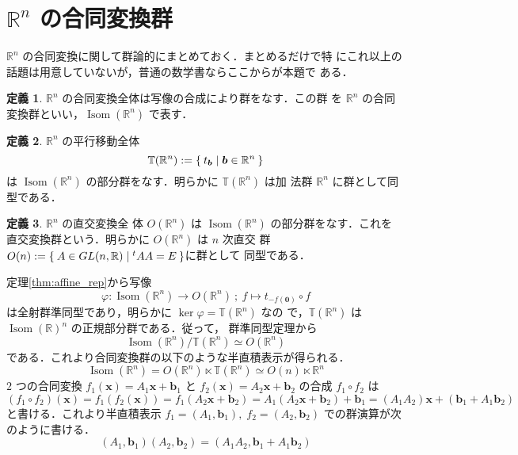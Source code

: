 \documentclass[11pt, uplatex, dvipdfmx, titlepage]{jsarticle}
\DeclareMathOperator{\Isom}{Isom}
\theoremstyle{definition}
\newtheorem*{definition}{定義}
\begin{document}
\section{$\mathbb{R}^n$ の合同変換群}\label{sec:orthogonal}

$\mathbb{R}^n$ の合同変換に関して群論的にまとめておく．まとめるだけで特
にこれ以上の話題は用意していないが，普通の数学書ならここからが本題で
ある．

\begin{definition}
  $\mathbb{R}^n$ の合同変換全体は写像の合成により群をなす．この群
  を $\mathbb{R}^n$ の合同変換群といい，$\Isom(\mathbb{R}^n)$ で表す．
\end{definition}

\begin{definition}
  $\mathbb{R}^n$ の平行移動全体
  \[
    \mathbb{T}(\mathbb{R}^n):=\Set{ t_{\bm{b}} | \bm{b} \in \mathbb{R}^n}
  \]
  は $\Isom(\mathbb{R}^n)$ の部分群をなす．明らかに $\mathbb{T}(\mathbb{R}^n)$ は加
  法群 $\mathbb{R}^n$ に群として同型である．
\end{definition}

\begin{definition}
  $\mathbb{R}^n$ の直交変換全
  体 $O(\mathbb{R}^n)$ は $\Isom(\mathbb{R}^n)$ の部分群をなす．これを
  直交変換群という．明らかに $O(\mathbb{R}^n)$ は $n$ 次直交
  群 $O(n):=\Set{ A \in GL(n,\mathbb{R}) | {}^{t}A A = E}$に群として
  同型である．
\end{definition}


定理\ref{thm:affine_rep}から写像
\[
  \varphi : \Isom(\mathbb{R}^n) \to O(\mathbb{R}^n) \ ; \ f \mapsto t_{-f(\bm{0})} \circ f 
\]
は全射群準同型であり，明らかに $\ker \varphi = \mathbb{T}(\mathbb{R}^n)$ なの
で，$\mathbb{T}(\mathbb{R}^n)$ は $\Isom(\mathbb{R})^n$ の正規部分群である．従って，
群準同型定理から
\[
  \Isom(\mathbb{R}^n)/\mathbb{T}(\mathbb{R}^n) \simeq O(\mathbb{R}^n)
\]
である．これより合同変換群の以下のような半直積表示が得られる．
\[
  \Isom(\mathbb{R}^n) = O(\mathbb{R}^n)  \ltimes \mathbb{T}(\mathbb{R}^n) \simeq O(n)\ltimes \mathbb{R}^n
\]
$2$ つの合同変換
$f_1(\bm{x}) = A_1 \bm{x} + \bm{b}_1$ と $f_2(\bm{x}) = A_2 \bm{x} +
\bm{b}_2$ の合成 $f_1 \circ f_2$ は
\[
  \left(f_1 \circ f_2 \right)(\bm{x}) =  f_1\left( f_2\left( \bm{x}\right)\right)
  = f_1\left(A_2\bm{x}+\bm{b}_2\right) = A_1\left(A_2\bm{x} + \bm{b}_2\right) + \bm{b}_1
  = \left( A_1 A_2\right) \bm{x} + \left( \bm{b}_1 + A_1 \bm{b}_2\right)
\]
と書ける．これより半直積表示 $f_1 = (A_1, \bm{b}_1), \; f_2 = (A_2,
\bm{b}_2)$ での群演算が次のように書ける．
\[
  \left(A_1, \bm{b}_1\right)  \left( A_2, \bm{b}_2\right) = \left( A_1 A_2, \bm{b}_1 + A_1 \bm{b}_2\right)
\]
\end{document}
